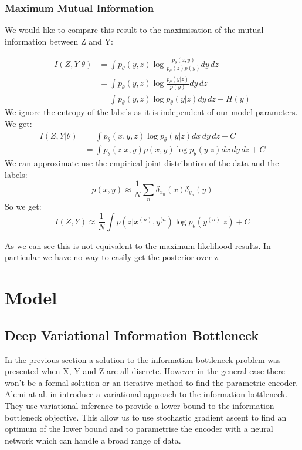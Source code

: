 \documentclass[10pt,oneside,openright]{report}
\begin{document}
\subsection{Maximum Mutual Information}

We would like to compare this result to the maximisation of the  mutual information between Z and Y:

\begin{align}
I(Z, Y|\theta) &= \int p_\theta(y, z) \log \frac{p_\theta(z, y)}{p_\theta(z)p(y)} dy\,dz\\
& = \int p_\theta(y, z) \log \frac{p_\theta(y|z)}{p(y)} dy\,dz\\
&= \int p_\theta(y, z) \log p_\theta(y|z) dy\,dz - H(y) 
\end{align}
We ignore the entropy of the labels as it is independent of our model parameters. We get:
\begin{align}
I(Z, Y|\theta) &= \int p_\theta(x, y, z) \log p_\theta(y| z) dx\,dy\,dz + C\\
&= \int p_\theta(z | x, y) p(x, y) \log p_\theta(y | z) dx\,dy\,dz + C
\end{align}
We can approximate use the empirical joint distribution of the data and the labels:
$$ p(x, y) \approx \frac{1}{N}\sum_n \delta_{x_n}(x) \delta_{y_n}(y)$$
So we get:
$$ I(Z, Y) \approx \frac{1}{N} \int p(z | x^{(n)}, y^{(n}) \log p_\theta(y^{(n)} | z) + C$$

As we can see this is not equivalent to the maximum likelihood results. In particular we have no way to easily get the posterior over z. 

\chapter{Model}
\section{Deep Variational Information Bottleneck}

In the previous section a solution to the information bottleneck problem was presented when X, Y and Z are all discrete. However in the general case there won't be a formal solution or an iterative method to find the parametric encoder. Alemi at al. in \cite{vib} introduce a variational approach to the information bottleneck. They use variational inference to provide a lower bound to the information bottleneck objective. This allow us to use stochastic gradient ascent to find an optimum of the lower bound and to parametrise the encoder with a neural network which can handle a broad range of data.
\end{document}
